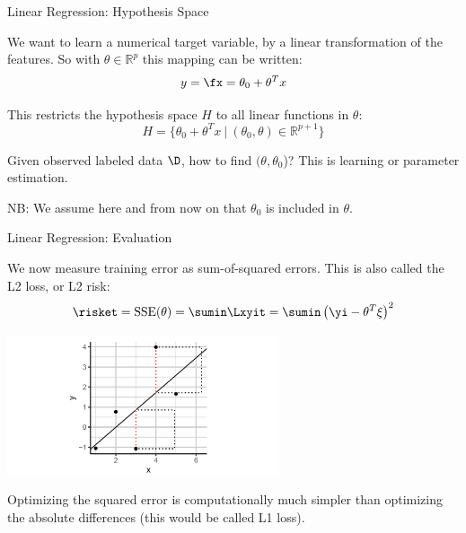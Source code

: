 \begin{frame}{Linear Regression: Hypothesis Space}

We want to learn a numerical target variable, by a linear transformation
of the features. So with \(\theta \in \mathbb{R}^p\) this mapping can be
written: \[
y = \fx = \theta_0 + \theta^T x
\]

This restricts the hypothesis space \(H\) to all linear functions in
\(\theta\): \[
H = \{ \theta_0 + \theta^T x\ |\ (\theta_0, \theta) \in \mathbb{R}^{p+1} \}
\]

Given observed labeled data \(\D\), how to find \((\theta, \theta_0\))?
This is learning or parameter estimation.

NB: We assume here and from now on that \(\theta_0\) is included in
\(\theta\).

\end{frame}

\begin{frame}{Linear Regression: Evaluation}

We now measure training error as sum-of-squared errors. This is also
called the L2 loss, or L2 risk: \[
\risket = \operatorname{SSE}(\theta) = \sumin \Lxyit = \sumin \left(\yi - \theta^T \xi\right)^2
\]

\scriptsize

\begin{center}
\includegraphics[width=0.6\textwidth]{plots/lin-reg.png}
\end{center}


\normalsize  \vspace{-0.4cm} Optimizing the squared error is
computationally much simpler than optimizing the absolute differences
(this would be called L1 loss).

\end{frame}


